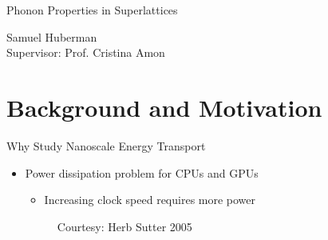 \documentclass{beamer}
\begin{document}
\begin{frame}
\Large{Phonon Properties in Superlattices}

\small{Samuel Huberman}\\
\small{Supervisor: Prof. Cristina Amon}\\

\date{
	\\
	\vspace{1cm}
	\today
}
\end{frame}

\section{Background and Motivation}
\begin{frame}{Why Study Nanoscale Energy Transport}
\begin{itemize}
\item Power dissipation problem for CPUs and GPUs
\begin{itemize}
\item Increasing clock speed requires more power
\end{itemize}
\begin{figure}[t]
\begin{center}
\vspace*{-0.0cm}
\renewcommand{\figure}{Fig.}
\label{fig:CPU_scaling}
\caption{\small{Courtesy: Herb Sutter 2005}}
\end{center}
\end{figure}
\end{itemize}
\end{frame}
\end{document}
